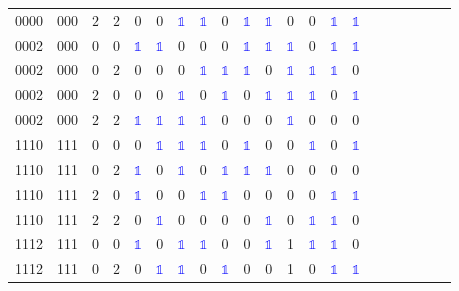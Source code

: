 \begin{longtable*}{c| cccccccccccccccccccc }
0000& 000& $2$& $2$& 0& 0& \textcolor{blue}{$\mathds{1}$}& \textcolor{blue}{$\mathds{1}$}& 0& \textcolor{blue}{$\mathds{1}$}& \textcolor{blue}{$\mathds{1}$}& 0& 0& \textcolor{blue}{$\mathds{1}$}& \textcolor{blue}{$\mathds{1}$}\\
0002& 000& $0$& $0$& \textcolor{blue}{$\mathds{1}$}& \textcolor{blue}{$\mathds{1}$}& 0& 0& 0& \textcolor{blue}{$\mathds{1}$}& \textcolor{blue}{$\mathds{1}$}& \textcolor{blue}{$\mathds{1}$}& 0& \textcolor{blue}{$\mathds{1}$}& \textcolor{blue}{$\mathds{1}$}\\
0002& 000& $0$& $2$& 0& 0& 0& \textcolor{blue}{$\mathds{1}$}& \textcolor{blue}{$\mathds{1}$}& \textcolor{blue}{$\mathds{1}$}& 0& \textcolor{blue}{$\mathds{1}$}& \textcolor{blue}{$\mathds{1}$}& \textcolor{blue}{$\mathds{1}$}& 0\\
0002& 000& $2$& $0$& 0& 0& \textcolor{blue}{$\mathds{1}$}& 0& \textcolor{blue}{$\mathds{1}$}& 0& \textcolor{blue}{$\mathds{1}$}& \textcolor{blue}{$\mathds{1}$}& \textcolor{blue}{$\mathds{1}$}& 0& \textcolor{blue}{$\mathds{1}$}\\
0002& 000& $2$& $2$& \textcolor{blue}{$\mathds{1}$}& \textcolor{blue}{$\mathds{1}$}& \textcolor{blue}{$\mathds{1}$}& \textcolor{blue}{$\mathds{1}$}& 0& 0& 0& \textcolor{blue}{$\mathds{1}$}& 0& 0& 0\\
1110& 111& $0$& $0$& 0& \textcolor{blue}{$\mathds{1}$}& \textcolor{blue}{$\mathds{1}$}& \textcolor{blue}{$\mathds{1}$}& 0& \textcolor{blue}{$\mathds{1}$}& 0& 0& \textcolor{blue}{$\mathds{1}$}& 0& \textcolor{blue}{$\mathds{1}$}\\
1110& 111& $0$& $2$& \textcolor{blue}{$\mathds{1}$}& 0& \textcolor{blue}{$\mathds{1}$}& 0& \textcolor{blue}{$\mathds{1}$}& \textcolor{blue}{$\mathds{1}$}& \textcolor{blue}{$\mathds{1}$}& 0& 0& 0& 0\\
1110& 111& $2$& $0$& \textcolor{blue}{$\mathds{1}$}& 0& 0& \textcolor{blue}{$\mathds{1}$}& \textcolor{blue}{$\mathds{1}$}& 0& 0& 0& 0& \textcolor{blue}{$\mathds{1}$}& \textcolor{blue}{$\mathds{1}$}\\
1110& 111& $2$& $2$& 0& \textcolor{blue}{$\mathds{1}$}& 0& 0& 0& 0& \textcolor{blue}{$\mathds{1}$}& 0& \textcolor{blue}{$\mathds{1}$}& \textcolor{blue}{$\mathds{1}$}& 0\\
1112& 111& $0$& $0$& \textcolor{blue}{$\mathds{1}$}& 0& \textcolor{blue}{$\mathds{1}$}& \textcolor{blue}{$\mathds{1}$}& 0& 0& \textcolor{blue}{$\mathds{1}$}& 1& \textcolor{blue}{$\mathds{1}$}& \textcolor{blue}{$\mathds{1}$}& 0\\
1112& 111& $0$& $2$& 0& \textcolor{blue}{$\mathds{1}$}& \textcolor{blue}{$\mathds{1}$}& 0& \textcolor{blue}{$\mathds{1}$}& 0& 0& 1& 0& \textcolor{blue}{$\mathds{1}$}& \textcolor{blue}{$\mathds{1}$}\\

\end{longtable*}

